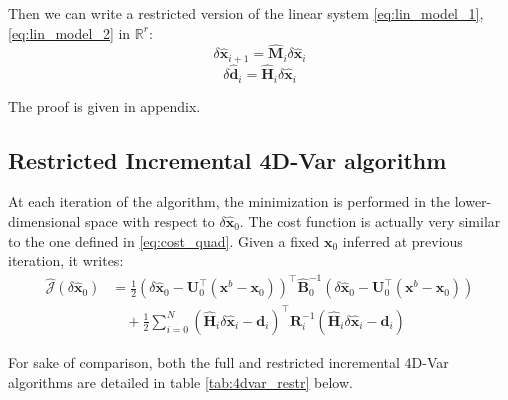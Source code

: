 \documentclass[a4paper,10pt]{article}
\newcommand{\MJ}{\mathcal J}
\newcommand{\BR}{{\mathbf R}}
\newcommand{\BB}{{\mathbf B}}
\newcommand{\BH}{{\mathbf H}}
\newcommand{\BM}{{\mathbf M}}
\newcommand{\BU}{{\mathbf U}}
\newcommand{\bx}{{\boldsymbol x}}
\newcommand{\bd}{{\boldsymbol d}}
\newcommand{\hx}{\hat \bx}
\newcommand{\hd}{\hat \bd}
\newcommand{\HM}{\hat \BM}
\newcommand{\HH}{\hat \BH}
\newcommand{\HB}{\hat \BB}
\newcommand{\dhx}{\delta \hx}
\newcommand{\dhd}{\delta \hd}
\newcommand{\HJ}{\hat{\MJ}}
\newcommand{\mathR}{\mathbb{R}}
\newcommand{\sumin}{\sum_{i=0}^{N}}
\begin{document}
Then we can write a restricted version of the linear system \eqref{eq:lin_model_1}, \eqref{eq:lin_model_2} in $\mathR^r$:
\begin{equation}
\label{eq:restr_model_1}
	\dhx_{i+1} = \HM_i \dhx_i
\end{equation}
\begin{equation}
\label{eq:restr_model_2}
	\dhd_i = \HH_i \dhx_i
\end{equation}

The proof is given in appendix.

\subsection{Restricted Incremental 4D-Var algorithm}

At each iteration of the algorithm, the minimization is performed in the lower-dimensional space with respect to $\dhx_0$. The cost function is actually very similar to the one defined in \eqref{eq:cost_quad}. Given a fixed $\bx_0$ inferred at previous iteration, it writes:
\begin{equation}
\begin{split}
	\HJ(\dhx_0)
		& = \frac{1}{2} \left(\dhx_0 - \BU_0^\top (\bx^b - \bx_0)\right)^\top \HB_0^{-1} \left(\dhx_0 - \BU_0^\top (\bx^b - \bx_0)\right) \\
		& \quad + \frac{1}{2} \sumin (\HH_i \dhx_i - \bd_i)^\top \BR_i^{-1} (\HH_i \dhx_i - \bd_i)
\end{split}
\end{equation}

For sake of comparison, both the full and restricted incremental 4D-Var algorithms are detailed in table \ref{tab:4dvar_restr} below.
\vspace{10pt}
\end{document}
